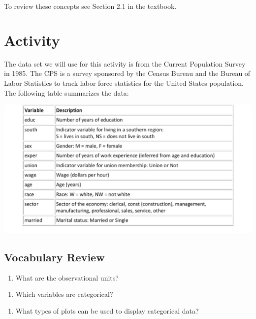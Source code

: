 \documentclass[
]{report}
\providecommand{\tightlist}{%
  \setlength{\itemsep}{0pt}\setlength{\parskip}{0pt}}
\begin{document}
To review these concepts see Section 2.1 in the textbook.

\newpage

\hypertarget{activity}{%
\section{Activity}\label{activity}}

The data set we will use for this activity is from the Current Population Survey in 1985. The CPS is a survey sponsored by the Census Bureau and the Bureau of Labor Statistics to track labor force statistics for the United States population. The following table summarizes the data:

\begin{center}\includegraphics[width=0.7\linewidth]{images/cps} \end{center}

\hypertarget{vocabulary-review}{%
\subsection{Vocabulary Review}\label{vocabulary-review}}

\begin{enumerate}
\def\labelenumi{\arabic{enumi}.}
\tightlist
\item
  What are the observational units?
\end{enumerate}

\vspace{0.5in}

\begin{enumerate}
\def\labelenumi{\arabic{enumi}.}
\setcounter{enumi}{1}
\tightlist
\item
  Which variables are categorical?
\end{enumerate}

\vspace{0.5in}

\begin{enumerate}
\def\labelenumi{\arabic{enumi}.}
\setcounter{enumi}{2}
\tightlist
\item
  What types of plots can be used to display categorical data?
\end{enumerate}
\end{document}
